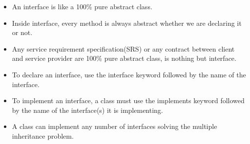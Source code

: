 \setlength{\columnsep}{3pt}
\begin{flushleft}
	
	\begin{itemize}
		\item An interface is like a 100\% pure abstract class.
		\item Inside interface, every method is always abstract whether we are declaring it or not.
		\item Any service requirement specification(SRS) or any contract between client and service provider are 100\% pure abstract class, is nothing but interface.
		
		\item To declare an interface, use the interface keyword followed by the name of the interface.
		\bigskip

		\item To implement an interface, a class must use the implements keyword followed by the name of the interface(s) it is implementing.
		\bigskip
				
		\item A class can implement any number of interfaces solving the multiple inheritance problem.
				
	\end{itemize}	
	
\end{flushleft}

\newpage

